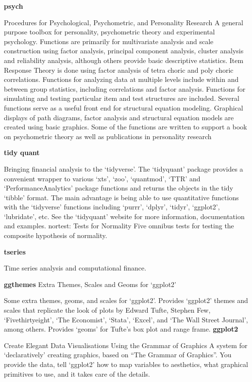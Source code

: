 \documentclass[12pt,openany]{book}
\begin{document}
\textbf{psych}

Procedures for Psychological, Psychometric, and Personality Research
A general purpose toolbox for personality, psychometric theory and experimental psychology. Functions are primarily for multivariate analysis and scale construction using factor analysis, principal component analysis, cluster analysis and reliability analysis, although others provide basic descriptive statistics. Item Response Theory is done using factor analysis of tetra choric and poly choric correlations. Functions for analyzing data at multiple levels include within and between group statistics, including correlations and factor analysis. Functions for simulating and testing particular item and test structures are included. Several functions serve as a useful front end for structural equation modeling. Graphical displays of path diagrams, factor analysis and structural equation models are created using basic graphics. Some of the functions are written to support a book on psychometric theory as well as publications in personality research

\textbf{tidy quant}

Bringing financial analysis to the `tidyverse'. The `tidyquant' package provides a convenient wrapper to various `xts', `zoo', `quantmod', `TTR' and `PerformanceAnalytics' package functions and returns the objects in the tidy `tibble' format. The main advantage is being able to use quantitative functions with the `tidyverse' functions including `purrr', `dplyr', `tidyr', `ggplot2', `lubridate', etc. See the `tidyquant' website for more information, documentation and examples.
nortest: Tests for Normality
Five omnibus tests for testing the composite hypothesis of normality.

\textbf{tseries}

Time series analysis and computational finance.

\textbf{ggthemes} Extra Themes, Scales and Geoms for `ggplot2'

Some extra themes, geoms, and scales for `ggplot2'. Provides `ggplot2' themes and scales that replicate the look of plots by Edward Tufte, Stephen Few, `Fivethirtyeight', `The Economist', `Stata', `Excel', and `The Wall Street Journal', among others. Provides `geoms' for Tufte's box plot and range frame.
\textbf{ggplot2}

Create Elegant Data Visualisations Using the Grammar of Graphics
A system for `declaratively' creating graphics, based on ``The Grammar of Graphics''. You provide the data, tell `ggplot2' how to map variables to aesthetics, what graphical primitives to use, and it takes care of the details.
\end{document}
